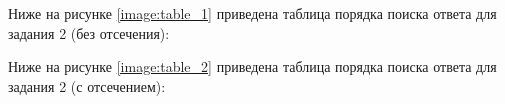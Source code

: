 Ниже на рисунке \ref{image:table_1} приведена таблица порядка поиска ответа для задания 2 (без отсечения):
\begin{figure}[H]
\end{figure}
Ниже на рисунке \ref{image:table_2} приведена таблица порядка поиска ответа для задания 2 (с отсечением):
